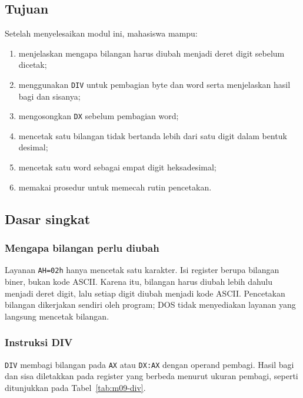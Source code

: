
\subsection{Tujuan}

\begin{tujuan}
Setelah menyelesaikan modul ini, mahasiswa mampu:
\begin{enumerate}
    \item menjelaskan mengapa bilangan harus diubah menjadi deret
          digit sebelum dicetak;
    \item menggunakan \texttt{DIV} untuk pembagian byte dan word
          serta menjelaskan hasil bagi dan sisanya;
    \item mengosongkan \texttt{DX} sebelum pembagian word;
    \item mencetak satu bilangan tidak bertanda lebih dari satu digit
          dalam bentuk desimal;
    \item mencetak satu word sebagai empat digit heksadesimal;
    \item memakai prosedur untuk memecah rutin pencetakan.
\end{enumerate}
\end{tujuan}

\subsection{Dasar singkat}

\subsubsection*{Mengapa bilangan perlu diubah}

Layanan \texttt{AH=02h} hanya mencetak satu karakter. Isi register
berupa bilangan biner, bukan kode ASCII. Karena itu, bilangan harus
diubah lebih dahulu menjadi deret digit, lalu setiap digit diubah
menjadi kode ASCII. Pencetakan bilangan dikerjakan sendiri oleh
program; DOS tidak menyediakan layanan yang langsung mencetak
bilangan.

\subsubsection*{Instruksi DIV}

\texttt{DIV} membagi bilangan pada \texttt{AX} atau \texttt{DX:AX}
dengan operand pembagi. Hasil bagi dan sisa diletakkan pada register
yang berbeda menurut ukuran pembagi, seperti ditunjukkan pada
Tabel~\ref{tab:m09-div}.

